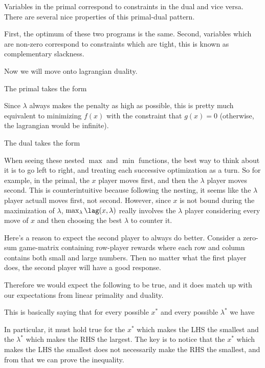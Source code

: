 \documentclass[12pt]{article}
\begin{document}
Variables in the primal correspond to constraints in the dual and vice versa. There are several nice properties of this primal-dual pattern.

First, the optimum of these two programs is the same. Second, variables which are non-zero correspond to constraints which are tight, this is known as complementary slackness. 

Now we will move onto lagrangian duality.

The primal takes the form


Since $\lambda$ always makes the penalty as high as possible, this is pretty much equivalent to minimizing $f(x)$ with the constraint that $g(x) = 0$ (otherwise, the lagrangian would be infinite).

The dual takes the form


When seeing these nested $\max$ and $\min$ functions, the best way to think about it is to go left to right, and treating each successive optimization as a turn. So for example, in the primal, the $x$ player moves first, and then the $\lambda$ player moves second. This is counterintuitive because following the nesting, it seems like the $\lambda$ player actuall moves first, not second. However, since $x$ is not bound during the maximization of $\lambda$, $\max_\lambda \lag(x, \lambda)$ really involves the $\lambda$ player considering every move of $x$ and then choosing the best $\lambda$ to counter it.

Here's a reason to expect the second player to always do better. Consider a zero-sum game-matrix containing row-player rewards  where each row and column contains both small and large numbers. Then no matter what the first player does, the second player will have a good response.

Therefore we would expect the following to be true, and it does match up with our expectations from linear primality and duality.


This is basically saying that for every possible $x^*$ and every possible $\lambda^*$ we have


In particular, it must hold true for the $x^*$ which makes the LHS the smallest and the $\lambda^*$ which makes the RHS the largest. The key is to notice that the $x^*$ which makes the LHS the smallest does not necessarily make the RHS the smallest, and from that we can prove the inequality.
\end{document}
